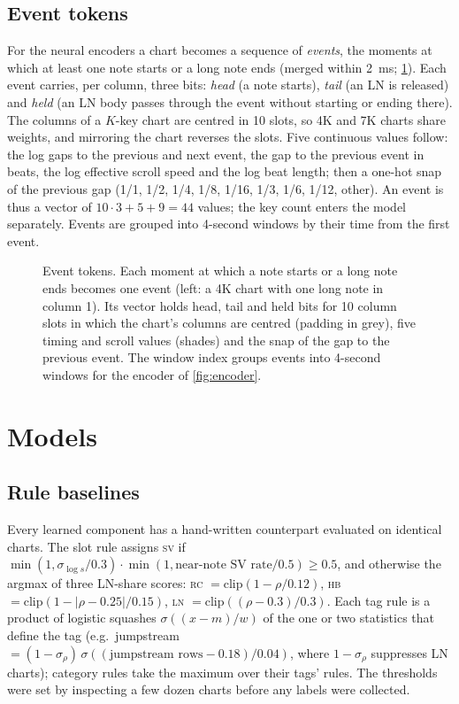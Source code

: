 \documentclass[10pt,twocolumn]{article}
\newcommand{\RC}{\textsc{rc}}
\newcommand{\LN}{\textsc{ln}}
\newcommand{\HB}{\textsc{hb}}
\newcommand{\SV}{\textsc{sv}}
\begin{document}
\subsection{Event tokens}\label{sec:tokens}
For the neural encoders a chart becomes a sequence of \emph{events}, the moments at which at least one note starts or a long note ends (merged within \SI{2}{ms}; \cref{fig:tokens}). Each event carries, per column, three bits: \emph{head} (a note starts), \emph{tail} (an LN is released) and \emph{held} (an LN body passes through the event without starting or ending there). The columns of a $K$-key chart are centred in 10 slots, so 4K and 7K charts share weights, and mirroring the chart reverses the slots. Five continuous values follow: the log gaps to the previous and next event, the gap to the previous event in beats, the log effective scroll speed and the log beat length; then a one-hot snap of the previous gap (1/1, 1/2, 1/4, 1/8, 1/16, 1/3, 1/6, 1/12, other). An event is thus a vector of $10\cdot3+5+9=44$ values; the key count enters the model separately. Events are grouped into 4-second windows by their time from the first event.

\begin{figure}[t]
\centering
\resizebox{\textwidth}{!}{}
\caption{Event tokens. Each moment at which a note starts or a long note ends becomes one event (left: a 4K chart with one long note in column 1). Its vector holds head, tail and held bits for 10 column slots in which the chart's columns are centred (padding in grey), five timing and scroll values (shades) and the snap of the gap to the previous event. The window index groups events into 4-second windows for the encoder of \cref{fig:encoder}.}
\label{fig:tokens}
\end{figure}

\section{Models}\label{sec:models}

\subsection{Rule baselines}\label{sec:rules}
Every learned component has a hand-written counterpart evaluated on identical charts. The slot rule assigns \SV{} if $\min(1,\sigma_{\log s}/0.3)\cdot\min(1,\text{near-note SV rate}/0.5)\ge0.5$, and otherwise the argmax of three LN-share scores: \RC{} $=\mathrm{clip}(1-\rho/0.12)$, \HB{} $=\mathrm{clip}(1-|\rho-0.25|/0.15)$, \LN{} $=\mathrm{clip}((\rho-0.3)/0.3)$. Each tag rule is a product of logistic squashes $\sigma((x-m)/w)$ of the one or two statistics that define the tag (e.g.\ jumpstream $=(1-\sigma_\rho)\,\sigma((\text{jumpstream rows}-0.18)/0.04)$, where $1-\sigma_\rho$ suppresses LN charts); category rules take the maximum over their tags' rules. The thresholds were set by inspecting a few dozen charts before any labels were collected.
\end{document}
